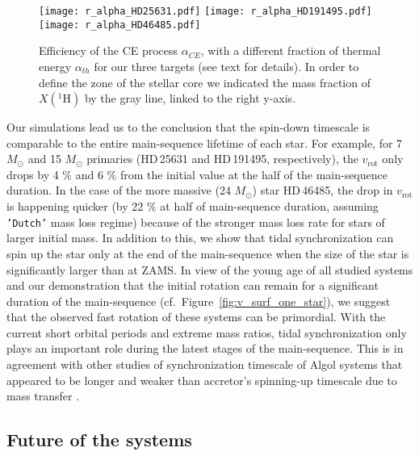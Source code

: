 \documentclass{aa}
\DeclareRobustCommand{\Figref}[1]{Figure~\ref{#1}}
\DeclareRobustCommand{\Tabref}[1]{Table~\ref{#1}}
\begin{document}
\begin{figure*}[!hbpt]
  \centering
  \texttt{[image: r\_alpha\_HD25631.pdf]}
  \texttt{[image: r\_alpha\_HD191495.pdf]}
  \texttt{[image: r\_alpha\_HD46485.pdf]}

  \caption{Efficiency of the CE process $\alpha_{CE}$, with a
    different fraction of thermal energy $\alpha_{th}$ for our three
    targets (see text for details). In order to define the zone of the
    stellar core we indicated the mass fraction of $X(^{1}\mathrm{H})$
    by the gray line, linked to the right y-axis.}
  \label{fig:hr_alpha}
\end{figure*}



Our simulations lead us to the conclusion that the spin-down timescale is comparable to the entire main-sequence lifetime of each star.
For example, for 7 $M_{\odot}$ and 15 $M_{\odot}$ primaries (HD\,25631 and HD\,191495, respectively), the $v_\mathrm{rot}$ only drops by 4 $\%$ and 6 $\%$ from the initial value at the half of the main-sequence duration.
In the case of the more massive (24 $M_{\odot}$) star HD\,46485, the
drop in $v_\mathrm{rot}$ is happening quicker (by 22 $\%$ at half of main-sequence duration, assuming \texttt{'Dutch'} mass loss regime) because of the
stronger mass loss rate for stars of larger initial mass.
In addition to this, we show that tidal synchronization can spin up the star only at the end of the main-sequence when the size of the star is significantly larger than at ZAMS.
In view of the young age of all studied systems \citep[$<$ 10 Myrs,
see \Tabref{table:sb1_fast} and][]{Naze_2023_rot} and our
demonstration that the initial rotation can remain for a significant
duration of the main-sequence (cf.~\Figref{fig:v_surf_one_star}), we suggest that the observed fast rotation
of these systems can be primordial.
With the current short orbital periods and extreme mass ratios, tidal
synchronization only plays an important role during the latest stages
of the main-sequence.
This is in agreement with other studies of synchronization timescale of Algol systems that appeared to be longer and weaker than accretor's spinning-up timescale due to mass transfer \citep[see, e.g.][]{Deschamps_2013}.



\subsection{Future of the systems}
\end{document}
